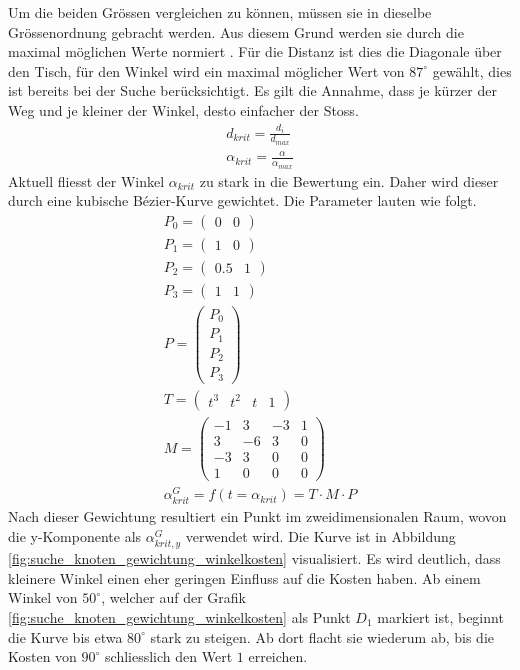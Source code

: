 Um die beiden Grössen vergleichen zu können, müssen sie in dieselbe Grössenordnung gebracht werden. Aus diesem Grund
werden sie durch die maximal möglichen Werte normiert \cite{qucosa:ein_billardroboter:1}. Für die Distanz ist dies die
Diagonale über den Tisch, für den Winkel wird ein maximal möglicher Wert von $87^\circ$ gewählt, dies ist bereits bei
der Suche berücksichtigt. Es gilt die Annahme, dass je kürzer der Weg und je kleiner der Winkel,
desto einfacher der Stoss.
\begin{align}
    d_{krit} = \frac{d_i}{d_{max}}\\
    \alpha_{krit} = \frac{\alpha}{\alpha_{max}}
\end{align}
Aktuell fliesst der Winkel $\alpha_{krit}$ zu stark in die Bewertung ein. Daher wird dieser durch eine kubische
Bézier-Kurve \cite{wiki.bezier:1} gewichtet. Die Parameter lauten wie folgt.
\begin{align}
    P_0 = \begin{pmatrix} 0 & 0\end{pmatrix}\\
    P_1 = \begin{pmatrix} 1 & 0\end{pmatrix}\\
    P_2 = \begin{pmatrix} 0.5 & 1\end{pmatrix}\\
    P_3 = \begin{pmatrix} 1 & 1\end{pmatrix}\\
    P = \begin{pmatrix} P_0 \\ P_1 \\ P_2 \\ P_3\end{pmatrix}\\
    T = \begin{pmatrix} t^3 & t^2 & t & 1\end{pmatrix}\\
    M = \begin{pmatrix}
            -1 &  3 & -3 & 1\\
             3 & -6 &  3 & 0\\
            -3 &  3 &  0 & 0\\
             1 &  0 &  0 & 0
        \end{pmatrix}\\
    \alpha^G_{krit} = f(t = \alpha_{krit}) = T \cdot M \cdot P
\end{align}
Nach dieser Gewichtung resultiert ein Punkt im zweidimensionalen Raum, wovon die y-Komponente als $\alpha^G_{krit, y}$ verwendet wird.
Die Kurve ist in Abbildung \ref{fig:suche_knoten_gewichtung_winkelkosten}
visualisiert. Es wird deutlich, dass kleinere Winkel einen eher geringen Einfluss auf die Kosten haben.
Ab einem Winkel von $50^\circ$, welcher auf der Grafik \ref{fig:suche_knoten_gewichtung_winkelkosten} als Punkt $D_1$ markiert ist,
beginnt die Kurve bis etwa $80^\circ$ stark zu steigen.
Ab dort flacht sie wiederum ab, bis die Kosten von $90^\circ$ schliesslich den Wert $1$ erreichen.

